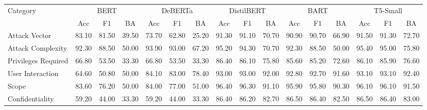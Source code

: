 \documentclass{article}
\begin{document}
\begin{table}[h!]
	\centering
	\small
	\begin{tabular}{|l|ccc|ccc|ccc|ccc|ccc|}
		\hline
		\multirow{2}{*}{Category} & \multicolumn{3}{c|}{BERT} & \multicolumn{3}{c|}{DeBERTa} & \multicolumn{3}{c|}{DistilBERT} & \multicolumn{3}{c|}{BART} & \multicolumn{3}{c|}{T5-Small}                                                                                 \\
		\cline{2-16}
		                          & Acc                       & F1                           & BA                              & Acc                       & F1                            & BA    & Acc   & F1    & BA    & Acc   & F1    & BA    & Acc   & F1    & BA    \\
		\hline
		Attack Vector             & 83.10                     & 81.50                        & 39.50                           & 73.70                     & 62.80                         & 25.20 & 91.30 & 91.10 & 70.70 & 90.90 & 90.70 & 66.90 & 91.50 & 91.30 & 72.70 \\
		Attack Complexity         & 92.30                     & 88.50                        & 50.00                           & 93.90                     & 93.00                         & 67.20 & 95.20 & 94.30 & 70.70 & 92.30 & 88.50 & 50.00 & 95.40 & 95.00 & 75.80 \\
		Privileges Required       & 66.80                     & 53.50                        & 33.30                           & 66.80                     & 53.50                         & 33.30 & 86.40 & 86.10 & 75.80 & 85.60 & 85.20 & 72.60 & 86.10 & 85.90 & 76.60 \\
		User Interaction          & 64.60                     & 50.80                        & 50.00                           & 84.10                     & 83.00                         & 78.40 & 93.00 & 93.00 & 92.00 & 92.80 & 92.70 & 91.60 & 93.10 & 93.10 & 92.40 \\
		Scope                     & 83.60                     & 76.20                        & 50.00                           & 84.00                     & 77.00                         & 51.00 & 96.40 & 96.30 & 91.10 & 95.90 & 95.80 & 90.30 & 96.10 & 96.10 & 91.50 \\
		Confidentiality           & 59.20                     & 44.00                        & 33.30                           & 59.20                     & 44.00                         & 33.30 & 86.40 & 86.20 & 82.70 & 86.50 & 86.40 & 82.50 & 86.50 & 86.40 & 83.00 \\

\end{tabular}
\end{table}
\end{document}
